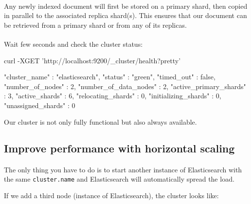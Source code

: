 \documentclass{article}%
\begin{document}
\paragraph{} Any newly indexed document will first be stored on a primary shard, then copied in parallel to the associated replica shard(s). This ensures that our document can be retrieved from a primary shard or from any of its replicas.

\paragraph{} Wait few seconds and check the cluster status:

\begin{command}
curl -XGET 'http://localhost:9200/_cluster/health?pretty'
\end{command}

\begin{command}
{
	"cluster_name" : "elasticsearch",
	"status" : "green",
	"timed_out" : false,
	"number_of_nodes" : 2,
	"number_of_data_nodes" : 2,
	"active_primary_shards" : 3,
	"active_shards" : 6,
	"relocating_shards" : 0,
	"initializing_shards" : 0,
	"unassigned_shards" : 0
}
\end{command}

Our cluster is not only fully functional but also always available.

\subsection{Improve performance with horizontal scaling}

\paragraph{} The only thing you have to do is to start another instance of Elasticsearch with the same \texttt{cluster.name} and Elasticsearch will automatically spread the load.

If we add a third node (instance of Elasticsearch), the cluster looks like:
\end{document}
